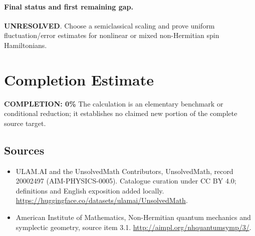 \documentclass[11pt]{article}
\begin{document}
\paragraph{Final status and first remaining gap.}
\textbf{UNRESOLVED}. Choose a semiclassical scaling and prove uniform fluctuation/error estimates for nonlinear or mixed non-Hermitian spin Hamiltonians.

\section{Completion Estimate}
\noindent\textbf{COMPLETION: 0\%}
The calculation is an elementary benchmark or conditional reduction; it establishes no claimed new portion of the complete source target.

\subsection{Sources}
\begin{itemize}
\item[\hypertarget{source:20002497:1}{S1}] ULAM.AI and the UnsolvedMath Contributors, UnsolvedMath, record 20002497 (AIM-PHYSICS-0005). Catalogue curation under CC BY 4.0; definitions and English exposition added locally.
\url{https://huggingface.co/datasets/ulamai/UnsolvedMath}.
\item[\hypertarget{source:20002497:2}{S2}] American Institute of Mathematics, Non-Hermitian quantum mechanics and symplectic geometry, source item 3.1.
\url{http://aimpl.org/nhquantumsymp/3/}.
\end{itemize}
\label{end:20002497}
\end{document}
